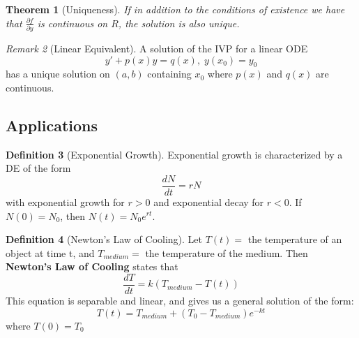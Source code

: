 \documentclass[12pt]{article}
\newtheorem{thm}{Theorem}[section]
\theoremstyle{definition}
\newtheorem{defn}[thm]{Definition}
\theoremstyle{remark}
\newtheorem{rmk}[thm]{Remark}
\numberwithin{equation}{section}
\newcommand\B[1]{\textbf{ #1}}
\newcommand\diriv[2]{\ensuremath{\frac{d #1}{d #2}}}
\begin{document}
\vspace{1cm}



\begin{thm}[Uniqueness]
        If in addition to the conditions of existence we have that $\frac{\partial f}{\partial y}$ is continuous on $R$, the solution is also unique.
\end{thm}


\vspace{1cm}


\begin{rmk}[Linear Equivalent]
        A solution of the IVP for a linear ODE \begin{equation}
                y' + p(x)y = q(x),\;y(x_0)=y_0
        \end{equation}
        has a unique solution on $(a,b)$ containing $x_0$ where $p(x)$ and $q(x)$ are continuous.
\end{rmk}

\vspace{1cm}



\subsection{Applications}


\begin{defn}[Exponential Growth]
        Exponential growth is characterized by a DE of the form \begin{equation}
                \frac{dN}{dt} = rN
        \end{equation}
        with exponential growth for $r > 0$ and exponential decay for $r < 0$. If $N(0) = N_0$, then $N(t) = N_0e^{rt}$.
\end{defn}


\vspace{1cm}

\begin{defn}[Newton's Law of Cooling]
        Let $T(t) = $ the temperature of an object at time t, and $T_{medium} = $ the temperature of the medium. Then \B{Newton's Law of Cooling} states that \begin{equation}
                \diriv{T}{t} = k(T_{medium}-T(t))
        \end{equation}
        This equation is separable and linear, and gives us a general solution of the form: \begin{equation}
                T(t) = T_{medium} + (T_0 - T_{medium})e^{-kt}
        \end{equation}
        where $T(0) = T_0$
\end{defn}
\end{document}
